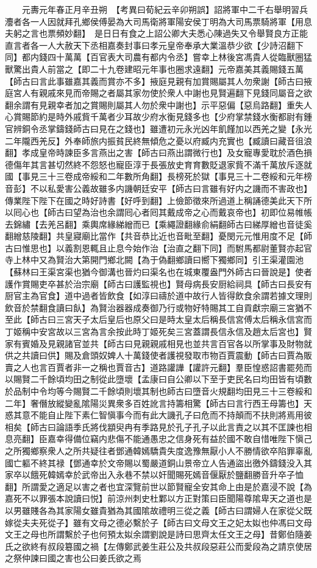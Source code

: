 　　元夀元年春正月辛丑朔　【考異曰荀紀云辛卯朔誤】詔將軍中二千右舉明習兵灋者各一人因就拜孔鄉侯傅晏為大司馬衛將軍陽安侯丁明為大司馬票騎將軍【用息夫躬之言也票頻妙翻】　是日日有食之上詔公卿大夫悉心陳過失又令舉賢良方正能直言者各一人大赦天下丞相嘉奏封事曰孝元皇帝奉承大業溫恭少欲【少詩沼翻下同】都内錢四十萬萬【百官表大司農有都内令丞】嘗幸上林後宮馮貴人從臨獸圈猛獸驚出貴人前當之【即二十九卷建昭元年事也圈求遠翻】元帝嘉美其義賜錢五萬【師古曰言此事雖嘉其義而賞亦不多】掖庭見親有加賞賜屬其人勿衆謝【師古曰掖庭宮人有親戚來見而帝賜之者屬其家勿使於衆人中謝也見賢遍翻下見錢同屬音之欲翻余謂有見親幸者加之賞賜則屬其人勿於衆中謝也】示平惡偏【惡烏路翻】重失人心賞賜節約是時外戚貲千萬者少耳故少府水衡見錢多也【少府掌禁錢水衡都尉有鍾官辨銅令丞掌鑄錢師古曰見在之錢也】雖遭初元永光凶年飢饉加以西羌之變【永光二年隴西羌反】外奉師旅内振貧民終無傾危之憂以府臧内充實也【臧讀曰藏音徂浪翻】孝成皇帝時諫臣多言燕出之害【師古曰燕出謂微行也】及女寵專愛耽於酒色損德傷年其言甚切然終不怨怒也寵臣淳于長張放史育育數貶退家貲不滿千萬放斥逐就國【事見三十三卷成帝綏和二年數所角翻】長榜死於獄【事見三十二卷綏和元年榜音彭】不以私愛害公義故雖多内譏朝廷安平【師古曰言雖有好内之譏而不害政也】傳業陛下陛下在國之時好詩書【好呼到翻】上儉節徵來所過道上稱誦德美此天下所以囘心也【師古曰望為治也余謂囘心者囘其戴成帝之心而戴哀帝也】初即位易帷帳去錦繡【去羌呂翻】乘輿席緣綈繒而已【乘繩證翻緣俞絹翻師古曰綈厚繒也音徒奚翻繒慈陵翻】共皇寢廟比當作【共音恭比近也音毗至翻】憂閔元元惟用度不足【師古曰惟思也】以義割恩輒且止息今始作治【治直之翻下同】而駙馬都尉董賢亦起官寺上林中又為賢治大第開門鄉北闕【為于偽翻鄉讀曰嚮下獨鄉同】引王渠灌園池【蘇林曰王渠宮渠也猶今御溝也晉灼曰渠名也在城東覆盎門外師古曰晉說是】使者護作賞賜吏卒甚於治宗廟【師古曰護監視也】賢母病長安厨給祠具【師古曰長安有厨官主為官食】道中過者皆飲食【如淳曰禱於道中故行人皆得飲食余謂若據文理則飲音於禁翻食讀曰飤】為賢治器器成奏御乃行或物好特賜其工自貢獻宗廟三宮猶不至此【師古曰三宮天子太后皇后也原父曰是時太皇太后稱長信宮傅太后稱永信宮而丁姬稱中安宮故以三宮為言余按此時丁姬死矣三宮蓋謂長信永信及趙太后宮也】賢家有賓婚及見親諸官並共【師古曰見親親戚相見也並共言百官各以所掌事及財物就供之共讀曰供】賜及倉頭奴婢人十萬錢使者護視發取市物百賈震動【師古曰賈為販賣之人也言百賈者非一之稱也賈音古】道路讙譁【讙許元翻】羣臣惶惑詔書罷苑而以賜賢二千餘頃均田之制從此墮壞【孟康曰自公卿以下至于吏民名曰均田皆有頃數於品制中令均等今賜賢二千餘頃則壞其制也師古曰墮音火規翻均田見三十三卷綏和二年】奢僭放縱變亂隂陽災異衆多百姓訛言持籌相驚【師古曰言行西王母籌也】天惑其意不能自止陛下素仁智愼事今而有此大譏孔子曰危而不持顛而不扶則將焉用彼相矣【師古曰論語季氏將伐顓臾冉有季路見於孔子孔子以此言責之以其不匡諫也相息亮翻】臣嘉幸得備位竊内悲傷不能通愚忠之信身死有益於國不敢自惜唯陛下愼己之所獨鄉察衆人之所共疑往者鄧通韓嫣驕貴失度逸豫無厭小人不勝情欲卒陷罪辜亂國亡軀不終其禄【鄧通幸於文帝賜以蜀嚴道銅山景帝立人告通盜出徼外鑄錢没入其家卒以餓死韓嫣幸於武帝出入永巷不禁以奸聞賜死嫣音偃厭於鹽翻勝音升卒子恤翻】所謂愛之適足以害之者也宜深覽前世以節賢寵全安其命上由是於嘉浸不說【為嘉死不以罪張本說讀曰悦】前涼州刺史杜鄴以方正對策曰臣聞陽尊隂卑天之道也是以男雖賤各為其家陽女雖貴猶為其國隂故禮明三從之義【師古曰謂婦人在家從父既嫁從夫夫死從子】雖有文母之德必繫於子【師古曰文母文王之妃太姒也仲馮曰文母文王之母也所謂繫於子也何預太姒余謂劉說是詩曰思齊太任文王之母】昔鄭伯隨姜氏之欲終有叔段簒國之禍【左傳鄭武姜生莊公及共叔段惡莊公而愛段為之請京使居之祭仲諫曰國之害也公曰姜氏欲之焉